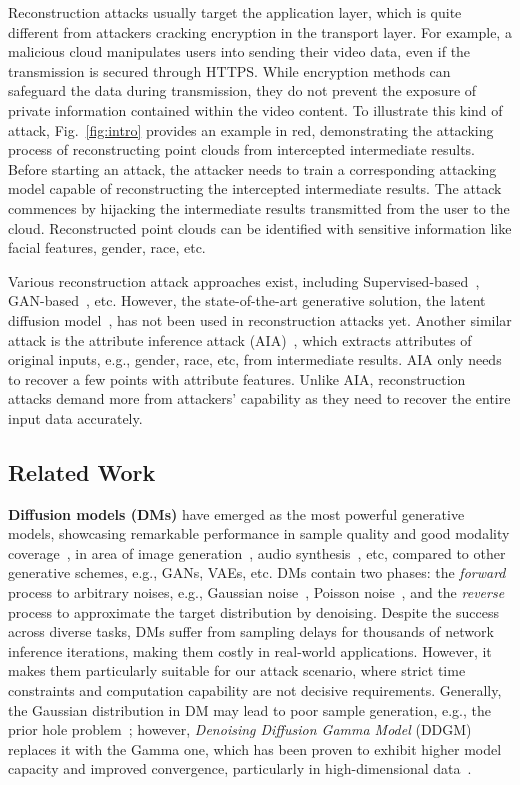 Reconstruction attacks usually target the application layer, which is quite different from attackers cracking encryption in the transport layer. For example, a malicious cloud manipulates users into sending their video data, even if the transmission is secured through HTTPS. While encryption methods can safeguard the data during transmission, they do not prevent the exposure of private information contained within the video content. To illustrate this kind of attack, Fig.~\ref{fig:intro} provides an example in red, demonstrating the attacking process of reconstructing point clouds from intercepted intermediate results. 
Before starting an attack, the attacker needs to train a corresponding attacking model capable of reconstructing the intercepted intermediate results. The attack commences by hijacking the intermediate results transmitted from the user to the cloud.
Reconstructed point clouds can be identified with sensitive information like facial features, gender, race, etc.

Various reconstruction attack approaches exist, including Supervised-based~\cite{dosovitskiy2016inverting}, GAN-based~\cite{spgan}, etc. However, the state-of-the-art generative solution, the latent diffusion model~\cite{rombach2022ldm}, has not been used in reconstruction attacks yet. 
Another similar attack is the attribute inference attack (AIA)~\cite{rigaki2023survey}, which extracts attributes of original inputs, e.g., gender, race, etc, from intermediate results. AIA only needs to recover a few points with attribute features.
Unlike AIA, reconstruction attacks demand more from attackers' capability as they need to recover the entire input data accurately.

\subsection{Related Work}
\textbf{Diffusion models (DMs)} have emerged as the most powerful generative models, showcasing remarkable performance in sample quality and good modality coverage~\cite{huang2021variational}, in area of image generation~\cite{anomaly,frido}, audio synthesis~\cite{kong2020diffwave}, etc, compared to other generative schemes, e.g., GANs, VAEs, etc.
DMs contain two phases: the \textit{forward} process to arbitrary noises, e.g., Gaussian noise~\cite{ho2020ddpm}, Poisson noise~\cite{xu2022poisson}, and the \textit{reverse} process to approximate the target distribution by denoising. 
Despite the success across diverse tasks, DMs suffer from sampling delays for thousands of network inference iterations, making them costly in real-world applications. However, it makes them particularly suitable for our attack scenario, where strict time constraints and computation capability are not decisive requirements. 
Generally, the Gaussian distribution in DM may lead to poor sample generation, e.g., the prior hole problem~\cite{sinha2021d2c,vahdat2021score}; however,
\textit{Denoising Diffusion Gamma Model} (DDGM)~\cite{nachmani2021ddgm} replaces it with the Gamma one, which has been proven to exhibit higher model capacity and improved convergence, particularly in high-dimensional data~\cite{chang2023design,croitoru2023diffusion}.

